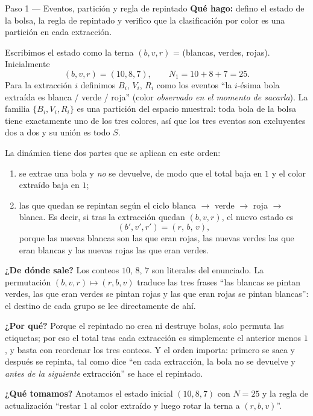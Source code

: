 \documentclass[11pt]{article}
\begin{document}
\begin{paso}{Paso 1 --- Eventos, partición y regla de repintado}
\textbf{Qué hago:} defino el estado de la bolsa, la regla de repintado y verifico que la clasificación por color es una partición en cada extracción.

Escribimos el estado como la terna $(b,v,r)$ = (blancas, verdes, rojas). Inicialmente
\[
(b,v,r)=(10,8,7),\qquad N_1=10+8+7=25 .
\]
Para la extracción $i$ definimos $B_i$, $V_i$, $R_i$ como los eventos ``la $i$-ésima bola extraída es blanca / verde / roja'' (color \emph{observado en el momento de sacarla}). La familia $\{B_i,V_i,R_i\}$ es una partición del espacio muestral: toda bola de la bolsa tiene exactamente uno de los tres colores, así que los tres eventos son excluyentes dos a dos y su unión es todo $S$.

La dinámica tiene dos partes que se aplican en este orden:
\begin{enumerate}[leftmargin=1.8em]
\item se extrae una bola y \emph{no} se devuelve, de modo que el total baja en $1$ y el color extraído baja en $1$;
\item las que quedan se repintan según el ciclo blanca $\to$ verde $\to$ roja $\to$ blanca. Es decir, si tras la extracción quedan $(b,v,r)$, el nuevo estado es
\[
(b',v',r')=(r,\,b,\,v),
\]
porque las nuevas blancas son las que eran rojas, las nuevas verdes las que eran blancas y las nuevas rojas las que eran verdes.
\end{enumerate}

\textbf{¿De dónde sale?} Los conteos $10$, $8$, $7$ son literales del enunciado. La permutación $(b,v,r)\mapsto(r,b,v)$ traduce las tres frases ``las blancas se pintan verdes, las que eran verdes se pintan rojas y las que eran rojas se pintan blancas'': el destino de cada grupo se lee directamente de ahí.

\textbf{¿Por qué?} Porque el repintado no crea ni destruye bolas, solo permuta las etiquetas; por eso el total tras cada extracción es simplemente el anterior menos $1$, y basta con reordenar los tres conteos. Y el orden importa: primero se saca y después se repinta, tal como dice ``en cada extracción, la bola no se devuelve y \emph{antes de la siguiente} extracción'' se hace el repintado.

\textbf{¿Qué tomamos?} Anotamos el estado inicial $(10,8,7)$ con $N=25$ y la regla de actualización ``restar $1$ al color extraído y luego rotar la terna a $(r,b,v)$''.
\end{paso}
\end{document}

